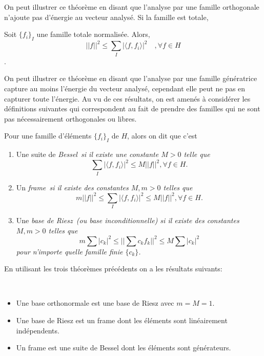 On peut illustrer ce théorème en disant que l'analyse par une famille orthogonale n'ajoute pas d'énergie au vecteur analysé.
Si la famille est totale,
\begin{theoreme}\label{th:norm1}
	Soit $\{f_i\}_I$ une famille totale normalisée.
	Alors,
	\begin{equation*}
		||f||^2 \leq \sum_I |\langle f, f_i \rangle|^2 \quad, \forall f \in H
	\end{equation*}.
\end{theoreme}
On peut illustrer ce théorème en disant que l'analyse par une famille génératrice capture au moins l'énergie du vecteur analysé, cependant elle peut ne pas en capturer toute l'énergie.
Au vu de ces résultats, on est amenés à considérer les définitions suivantes qui correspondent au fait de prendre des familles qui ne sont pas nécessairement orthogonales ou libres.
\begin{definition}
	Pour une famille d'éléments $\{f_i\}_I$ de $H$, alors on dit que c'est 
	\begin{enumerate}
		\item Une suite de \it{Bessel} si il existe une constante $M>0$ telle que
			\begin{equation*}
				\sum_I |\langle f, f_i \rangle|^2 \leq M||f||^2, \forall f \in H.
			\end{equation*}
		\item Un \it{frame} si il existe des constantes $M, m>0$ telles que
			\begin{equation}\label{eq:defFrame}
				m||f||^2 \leq \sum_I |\langle f, f_i\rangle|^2 \leq M||f||^2, \forall f \in H.
			\end{equation}
		\item Une \it{base de Riesz} (ou base \it{inconditionnelle}) si il existe des constantes $M, m>0$ telles que
			\begin{equation*}
				m\sum |c_k|^2 \leq ||\sum c_k f_k||^2 \leq M\sum |c_k|^2
			\end{equation*}
		pour n'importe quelle famille finie $\{c_k\}$.
	\end{enumerate}
\end{definition}
En utilisant les trois théorèmes précédents on a les résultats suivants: 
\begin{proposition}
	\
	\begin{itemize}
		\item Une base orthonormale est une base de Riesz avec $m = M = 1$.
		\item Une base de Riesz est un frame dont les éléments sont linéairement indépendents.
		\item Un frame est une suite de Bessel dont les éléments sont générateurs.
	\end{itemize}
\end{proposition}

